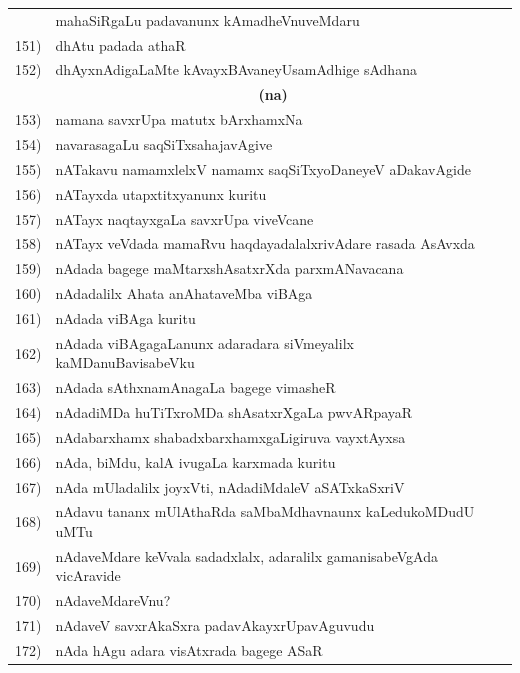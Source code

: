 {\begin{longtable}{@{}cp{7.4cm}r}
     & mahaSiRgaLu padavanunx kAmadheVnuveMdaru & \pageref{page205}\\
151) & dhAtu padada athaR & \pageref{page1} \\
152) & dhAyxnAdigaLaMte kAvayxBAvaneyUsamAdhige sAdhana & \pageref{page231}\\[0.3cm]
     &    \multicolumn{1}{c}{\textbf{(na)}}  & \\[0.3cm] 
153) & namana savxrUpa matutx bArxhamxNa & \pageref{page84}\\
154) & navarasagaLu saqSiTxsahajavAgive & \pageref{page222}\\
155) & nATakavu namamxlelxV namamx saqSiTxyoDaneyeV aDakavAgide & \pageref{page242}\\
156) & nATayxda utapxtitxyanunx kuritu & \pageref{page242}\\
157) & nATayx naqtayxgaLa savxrUpa viveVcane &  \pageref{page241}\\
158) & nATayx veVdada mamaRvu haqdayadalalxrivAdare rasada AsAvxda & \pageref{page244}\\
159) & nAdada bagege maMtarxshAsatxrXda parxmANavacana & \pageref{page159}\\
160) & nAdadalilx Ahata anAhataveMba viBAga & \pageref{page164}\\
161) & nAdada viBAga kuritu & \pageref{page158}\\
162) & nAdada viBAgagaLanunx adaradara siVmeyalilx kaMDanuBavisa\break beVku & \pageref{page173}\\
163) & nAdada sAthxnamAnagaLa bagege vimasheR & \pageref{page158}\\
164) & nAdadiMDa huTiTxroMDa shAsatxrXgaLa pwvARpayaR & \pageref{page175}\\
165) & nAdabarxhamx shabadxbarxhamxgaLigiruva vayxtAyxsa & \pageref{page160}\\
166) & nAda, biMdu, kalA ivugaLa karxmada kuritu & \pageref{page177}\\
167) & nAda mUladalilx joyxVti, nAdadiMdaleV aSATxkaSxriV & \pageref{page172}\\
168) & nAdavu tananx mUlAthaRda saMbaMdhavnaunx kaLedu\break koMDudU uMTu & \pageref{page178}\\
169) & nAdaveMdare keVvala sadadxlalx, adaralilx gamanisabeVgAda vicAravide & \pageref{page169}\\
170) & nAdaveMdareVnu? & \pageref{page142}\\
171) & nAdaveV savxrAkaSxra padavAkayxrUpavAguvudu & \pageref{page141}\\
172) & nAda hAgu adara visAtxrada bagege ASaR & \\

\end{longtable}}
